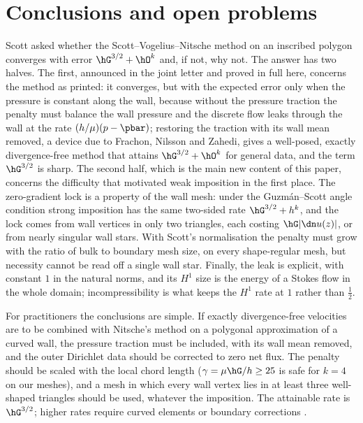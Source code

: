 \section{Conclusions and open problems}\label{sec:conclusions}

Scott asked whether the Scott--Vogelius--Nitsche method on an inscribed polygon converges with error $\hG^{3/2}+\hO^k$ and, if not, why not. The answer has two halves. The first, announced in the joint letter \cite{CavalcantePadhiLetter} and proved in full here, concerns the method as printed: it converges, but with the expected error only when the pressure is constant along the wall, because without the pressure traction the penalty must balance the wall pressure and the discrete flow leaks through the wall at the rate $(h/\mu)(p-\pbar)$; restoring the traction with its wall mean removed, a device due to Frachon, Nilsson and Zahedi, gives a well-posed, exactly divergence-free method that attains $\hG^{3/2}+\hO^k$ for general data, and the term $\hG^{3/2}$ is sharp. The second half, which is the main new content of this paper, concerns the difficulty that motivated weak imposition in the first place. The zero-gradient lock is a property of the wall mesh: under the Guzm\'an--Scott angle condition strong imposition has the same two-sided rate $\hG^{3/2}+h^k$, and the lock comes from wall vertices in only two triangles, each costing $\hG|\dn u(z)|$, or from nearly singular wall stars. With Scott's normalisation the penalty must grow with the ratio of bulk to boundary mesh size, on every shape-regular mesh, but necessity cannot be read off a single wall star. Finally, the leak is explicit, with constant $1$ in the natural norms, and its $H^1$ size is the energy of a Stokes flow in the whole domain; incompressibility is what keeps the $H^1$ rate at $1$ rather than $\frac12$.

For practitioners the conclusions are simple. If exactly divergence-free velocities are to be combined with Nitsche's method on a polygonal approximation of a curved wall, the pressure traction must be included, with its wall mean removed, and the outer Dirichlet data should be corrected to zero net flux. The penalty should be scaled with the local chord length ($\gamma=\mu\hG/h\ge25$ is safe for $k=4$ on our meshes), and a mesh in which every wall vertex lies in at least three well-shaped triangles should be used, whatever the imposition. The attainable rate is $\hG^{3/2}$; higher rates require curved elements or boundary corrections \cite{NeilanOtus2021,DurstNeilan2024,LiuNeilanOtus2023,ChenLiu2026}.

